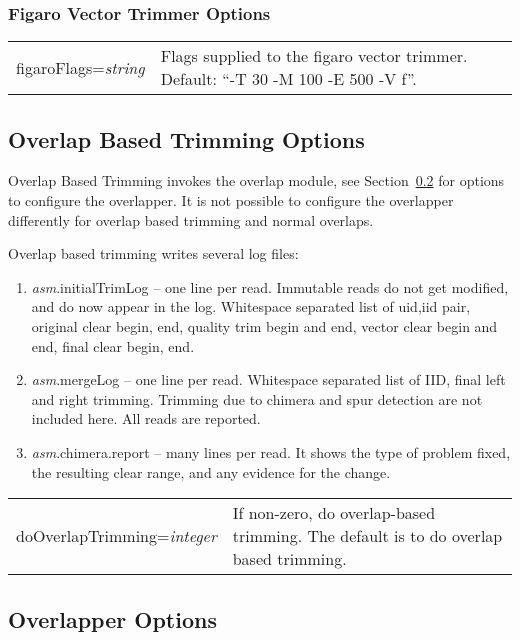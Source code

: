 \documentclass[twoside,11pt]{article}
\begin{document}
\subsubsection{Figaro Vector Trimmer Options}

\begin{longtable}{lp{3.0in}}
figaroFlags={\it string} &
Flags supplied to the figaro vector trimmer.  Default: ``-T 30 -M 100 -E 500 -V f''.
\\
\end{longtable}


\subsection{Overlap Based Trimming Options}
\label{sec:obtopts}

Overlap Based Trimming invokes the overlap module, see
Section~\ref{sec:overlapopts} for options to configure the overlapper.
It is not possible to configure the overlapper differently for overlap
based trimming and normal overlaps.

Overlap based trimming writes several log files:

\begin{enumerate}
\item {\it asm}.initialTrimLog -- one line per read.  Immutable reads do not
get modified, and do now appear in the log.  Whitespace separated list
of uid,iid pair, original clear begin, end, quality trim begin and
end, vector clear begin and end, final clear begin, end.

\item {\it asm}.mergeLog -- one line per read.  Whitespace separated list of
IID, final left and right trimming.  Trimming due to chimera and spur
detection are not included here.  All reads are reported.

\item {\it asm}.chimera.report -- many lines per read.  It shows the type of
problem fixed, the resulting clear range, and any evidence for the
change.
\end{enumerate}

\begin{longtable}{lp{3.0in}}
doOverlapTrimming={\it integer} &
If non-zero, do overlap-based trimming.  The default is to do overlap
based trimming.
\\
\end{longtable}


\subsection{Overlapper Options}
\label{sec:overlapopts}
\end{document}
